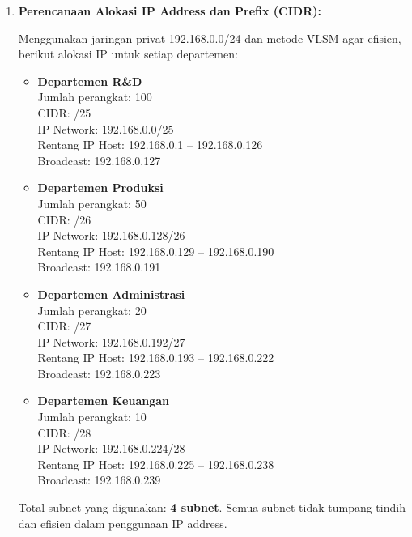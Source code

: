 \begin{enumerate}
    \item 
    \textbf{Perencanaan Alokasi IP Address dan Prefix (CIDR):}
    
    Menggunakan jaringan privat 192.168.0.0/24 dan metode VLSM agar efisien, berikut alokasi IP untuk setiap departemen:
    
    \begin{itemize}
        \item \textbf{Departemen R\&D} \\
        Jumlah perangkat: 100 \\
        CIDR: /25 \\
        IP Network: 192.168.0.0/25 \\
        Rentang IP Host: 192.168.0.1 – 192.168.0.126 \\
        Broadcast: 192.168.0.127
        
        \item \textbf{Departemen Produksi} \\
        Jumlah perangkat: 50 \\
        CIDR: /26 \\
        IP Network: 192.168.0.128/26 \\
        Rentang IP Host: 192.168.0.129 – 192.168.0.190 \\
        Broadcast: 192.168.0.191
        
        \item \textbf{Departemen Administrasi} \\
        Jumlah perangkat: 20 \\
        CIDR: /27 \\
        IP Network: 192.168.0.192/27 \\
        Rentang IP Host: 192.168.0.193 – 192.168.0.222 \\
        Broadcast: 192.168.0.223
        
        \item \textbf{Departemen Keuangan} \\
        Jumlah perangkat: 10 \\
        CIDR: /28 \\
        IP Network: 192.168.0.224/28 \\
        Rentang IP Host: 192.168.0.225 – 192.168.0.238 \\
        Broadcast: 192.168.0.239
    \end{itemize}
    
    Total subnet yang digunakan: \textbf{4 subnet}. Semua subnet tidak tumpang tindih dan efisien dalam penggunaan IP address.


\end{enumerate}
